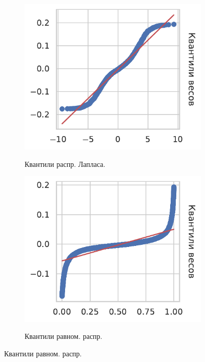\documentclass[12pt]{extarticle}
\begin{document}
\begin{figure}[!htb]
\begin{subfigure}[t]{0.3\linewidth}
        \label{fig:weights_norm}
     \end{subfigure}\\
     \begin{subfigure}[t]{0.3\linewidth}
        \centering
        \caption{Квантили распр. Лапласа.}
        \includegraphics[width=1\linewidth]{pics/weights_lapl.pdf}
        \label{fig:weights_lapl}
     \end{subfigure}
     \begin{subfigure}[t]{0.3\linewidth}
        \centering
        \caption{Квантили равном. распр.}
        \includegraphics[width=1\linewidth]{pics/weights_unif.pdf}
        \label{fig:weights_unif}
     \end{subfigure}
     \label{fig:model_weights_distribution}
\end{figure}
\end{document}
